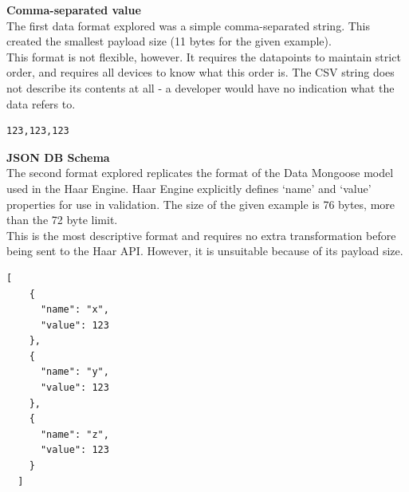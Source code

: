       \noindent
      \begin{minipage}[t]{0.45\textwidth}
        \textbf{Comma-separated value}\\
        The first data format explored was a simple comma-separated string. This created the smallest payload size (11 bytes for the given example).\\

        This format is not flexible, however. It requires the datapoints to maintain strict order, and requires all devices to know what this order is. The CSV string does not describe its contents at all - a developer would have no indication what the data refers to.\\
      \end{minipage}
      \hfill
      \begin{minipage}[t]{0.45\textwidth}
        \begin{lstlisting}[frame=single]
  123,123,123
        \end{lstlisting}
      \end{minipage}

      \noindent
      \begin{minipage}[t]{0.45\textwidth}
        \textbf{JSON DB Schema}\\
        The second format explored replicates the format of the Data Mongoose model used in the Haar Engine. Haar Engine explicitly defines `name' and `value' properties for use in validation. The size of the given example is 76 bytes, more than the 72 byte limit.\\

        This is the most descriptive format and requires no extra transformation before being sent to the Haar API. However, it is unsuitable because of its payload size.
      \end{minipage}
      \hfill
      \begin{minipage}[t]{0.45\textwidth}
        \begin{lstlisting}[frame=single]
  [
    {
      "name": "x",
      "value": 123
    },
    {
      "name": "y",
      "value": 123
    },
    {
      "name": "z",
      "value": 123
    }
  ]
        \end{lstlisting}
      \end{minipage}

